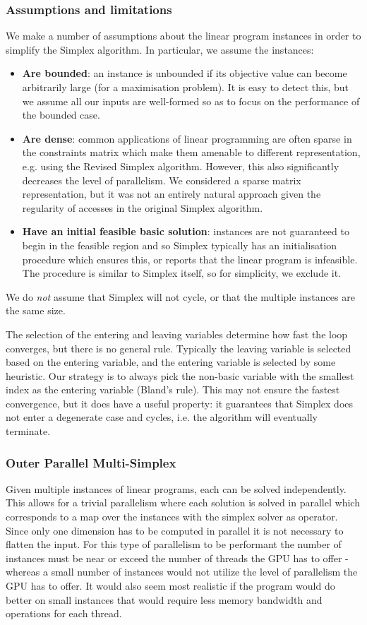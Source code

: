 \subsubsection{Assumptions and limitations}
We make a number of assumptions about the linear program instances in order to simplify the Simplex algorithm. In particular, we assume the instances:
\begin{itemize}
\item \textbf{Are bounded}: an instance is unbounded if its objective value can become arbitrarily large (for a maximisation problem). It is easy to detect this, but we assume all our inputs are well-formed so as to focus on the performance of the bounded case.
\item \textbf{Are dense}: common applications of linear programming are often sparse in the constraints matrix which make them amenable to different representation, e.g. using the Revised Simplex algorithm. However, this also significantly decreases the level of parallelism. We considered a sparse matrix representation, but it was not an entirely natural approach given the regularity of accesses in the original Simplex algorithm.
\item \textbf{Have an initial feasible basic solution}: instances are not guaranteed to begin in the feasible region and so Simplex typically has an initialisation procedure which ensures this, or reports that the linear program is infeasible. The procedure is similar to Simplex itself, so for simplicity, we exclude it.
\end{itemize}
We do \textit{not} assume that Simplex will not cycle, or that the multiple instances are the same size.

The selection of the entering and leaving variables determine how fast the loop converges, but there is no general rule. Typically the leaving variable is selected based on the entering variable, and the entering variable is selected by some heuristic. Our strategy is to always pick the non-basic variable with the smallest index as the entering variable (Bland's rule). This may not ensure the fastest convergence, but it does have a useful property: it guarantees that Simplex does not enter a degenerate case and cycles, i.e. the algorithm will eventually terminate.

\subsubsection{Outer Parallel Multi-Simplex}
Given multiple instances of linear programs, each can be solved independently. This allows for a trivial parallelism where each solution is solved in parallel which corresponds to a map over the instances with the simplex solver as operator. Since only one dimension has to be computed in parallel it is not necessary to flatten the input. For this type of parallelism to be performant the number of instances must be near or exceed the number of threads the GPU has to offer - whereas a small number of instances would not utilize the level of parallelism the GPU has to offer. It would also seem most realistic if the program would do better on small instances that would require less memory bandwidth and operations for each thread.

